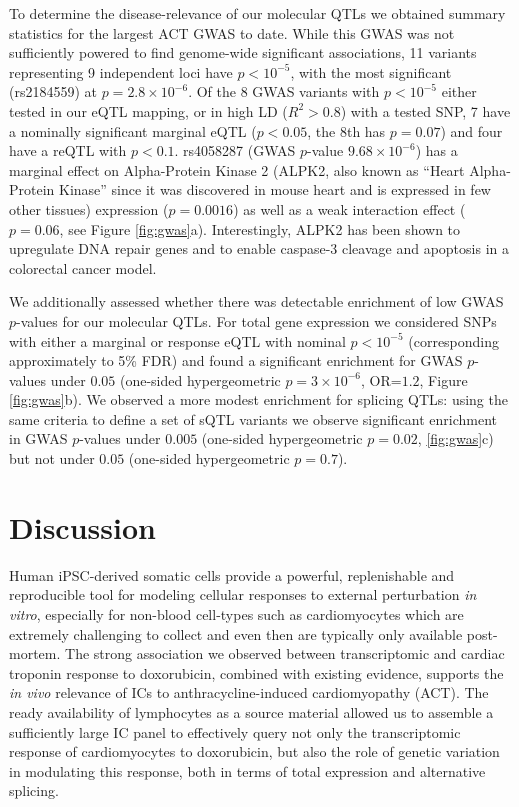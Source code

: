 \documentclass{article}
\begin{document}
{To determine the disease-relevance of our molecular QTLs we obtained summary statistics for the largest ACT GWAS to date\cite{Schneider2016}. While this GWAS was not sufficiently powered to find genome-wide significant associations, 11 variants representing 9 independent loci have $p<10^{-5}$, with the most significant (rs2184559) at $p=2.8 \times 10^{-6}$. Of the 8 GWAS variants with $p<10^{-5}$ either tested in our eQTL mapping, or in high LD ($R^2 > 0.8$) with a tested SNP, 7 have a nominally significant marginal eQTL ($p<0.05$, the 8th has $p=0.07$) and four have a reQTL with $p<0.1$. rs4058287 (GWAS $p$-value $9.68\times 10^{-6}$) has a marginal effect on Alpha-Protein Kinase 2 (ALPK2, also known as ``Heart Alpha-Protein Kinase'' since it was discovered in mouse heart\cite{ryazanov1999alpha} and is expressed in few other tissues\cite{Mele2015-sc}) expression ($p=0.0016$) as well as a weak interaction effect ($p=0.06$, see Figure \ref{fig:gwas}a). Interestingly, ALPK2 has been shown to upregulate DNA repair genes and to enable caspase-3 cleavage and apoptosis in a colorectal cancer model\citep{yoshida2012alpk2}. 

We additionally assessed whether there was detectable enrichment of low GWAS $p$-values for our molecular QTLs. For total gene expression we considered SNPs with either a marginal or response eQTL with nominal $p < 10^{-5}$ (corresponding approximately to 5\% FDR) and found a significant enrichment for GWAS $p$-values under $0.05$ (one-sided hypergeometric $p=3 \times 10^{-6}$, OR=$1.2$, Figure \ref{fig:gwas}b). We observed a more modest enrichment for splicing QTLs: using the same criteria to define a set of sQTL variants we observe significant enrichment in GWAS $p$-values under $0.005$ (one-sided hypergeometric $p=0.02$, \ref{fig:gwas}c) but not under $0.05$ (one-sided hypergeometric $p=0.7$).  

\section*{Discussion}

Human iPSC-derived somatic cells provide a powerful, replenishable and reproducible tool for modeling cellular responses to external perturbation \emph{in vitro}, especially for non-blood cell-types such as cardiomyocytes which are extremely challenging to collect and even then are typically only available post-mortem. 
The strong association we observed between transcriptomic and cardiac troponin response to doxorubicin, combined with existing evidence\cite{Burridge2016}, supports the \emph{in vivo} relevance of ICs to anthracycline-induced cardiomyopathy (ACT). 
The ready availability of lymphocytes as a source material allowed us to assemble a sufficiently large IC panel to effectively query not only the transcriptomic response of cardiomyocytes to doxorubicin, but also the role of genetic variation in modulating this response, both in terms of total expression and alternative splicing. 

}
\end{document}
